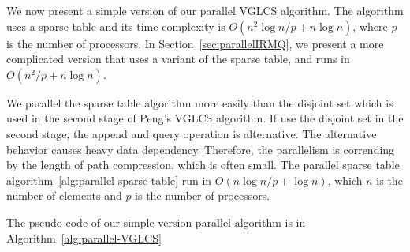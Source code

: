 We now present a simple version of our parallel VGLCS algorithm.  The
algorithm uses a sparse table and its time complexity is $O(n^2 \log n
/ p + n \log n)$, where $p$ is the number of processors.  In
Section~\ref{sec:parallelIRMQ}, we present a more complicated version
that uses a variant of the sparse table, and runs in $O(n^2 / p + n
\log n)$.

We parallel the sparse table algorithm more easily than the disjoint set
which is used in the second stage of Peng's VGLCS algorithm.  If use the
disjoint set in the second stage, the append and query operation is
alternative.  The alternative behavior causes heavy data dependency.
Therefore, the parallelism is corrending by the length of path
compression, which is often small.  The parallel sparse table
algorithm~\ref{alg:parallel-sparse-table} run in $O(n \log n / p + \log
n)$, which $n$ is the number of elements and $p$ is the number of
processors.





The pseudo code of our simple version parallel algorithm is in
Algorithm~\ref{alg:parallel-VGLCS}


